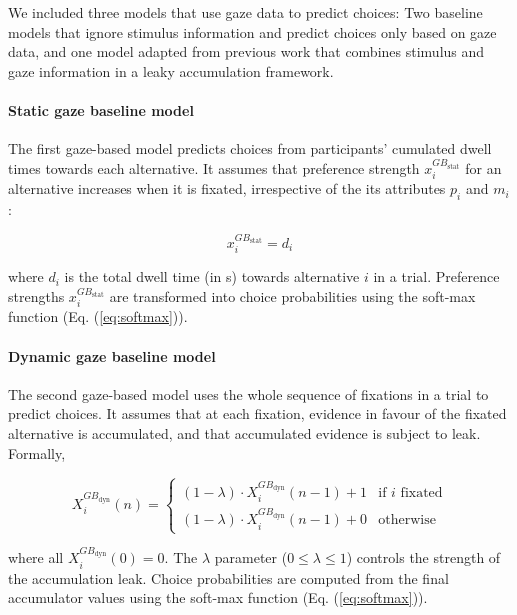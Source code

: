 \documentclass[11pt, a4paper]{article}
\begin{document}
We included three models that use gaze data to predict choices: Two baseline models that ignore stimulus information and predict choices only based on gaze data, and one model adapted from previous work \parencite{glickman2019FormationPreferenceRisky} that combines stimulus and gaze information in a leaky accumulation framework.
\paragraph{Static gaze baseline model}

The first gaze-based model predicts choices from participants' cumulated dwell times towards each alternative. It assumes that preference strength $x_i^{GB_{\text{stat}}}$ for an alternative increases when it is fixated, irrespective of the its attributes $p_i$ and $m_i$:

\begin{equation}
    x_i^{GB_{\text{stat}}} = d_i
\end{equation}

where $d_i$ is the total dwell time (in s) towards alternative $i$ in a trial. Preference strengths $x_i^{GB_{\text{stat}}}$ are transformed into choice probabilities using the soft-max function (Eq. (\ref{eq:softmax})).

\paragraph{Dynamic gaze baseline model}

The second gaze-based model uses the whole sequence of fixations in a trial to predict choices. It assumes that at each fixation, evidence in favour of the fixated alternative is accumulated, and that accumulated evidence is subject to leak. Formally,

\begin{equation}
    X_i^{GB_{\text{dyn}}}(n) = \begin{cases}
             (1 - \lambda) \cdot X_i^{GB_{\text{dyn}}}(n - 1) + 1 &\text{if $i$ fixated}\\
             (1 - \lambda) \cdot X_i^{GB_{\text{dyn}}}(n - 1) + 0 &\text{otherwise}
             \end{cases}
\end{equation}

where all $X_i^{GB_{\text{dyn}}}(0) = 0$. The $\lambda$ parameter ($0 \le \lambda \le 1$) controls the strength of the accumulation leak.
Choice probabilities are computed from the final accumulator values using the soft-max function (Eq. (\ref{eq:softmax})).
\end{document}
